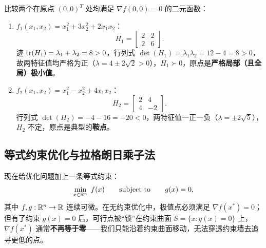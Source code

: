 \begin{example}[二维极小值与鞍点的手算辨析]\label{ex:ch5-min-vs-saddle}
比较两个在原点 $(0,0)^T$ 处均满足 $\nabla f(0,0) = 0$ 的二元函数：
\begin{enumerate}
  \item $f_1(x_1, x_2) = x_1^2 + 3x_2^2 + 2x_1 x_2$：
  \[
    H_1 = \begin{bmatrix} 2 & 2 \\ 2 & 6 \end{bmatrix}.
  \]
  迹 $\operatorname{tr}(H_1) = \lambda_1 + \lambda_2 = 8 > 0$，行列式 $\det(H_1) = \lambda_1\lambda_2 = 12 - 4 = 8 > 0$，故两特征值均严格为正（$\lambda = 4 \pm 2\sqrt{2} > 0$），$H_1 \succ 0$，原点是\textbf{严格局部（且全局）极小值}。
  \item $f_2(x_1, x_2) = x_1^2 - x_2^2 + 4x_1 x_2$：
  \[
    H_2 = \begin{bmatrix} 2 & 4 \\ 4 & -2 \end{bmatrix}.
  \]
  行列式 $\det(H_2) = -4 - 16 = -20 < 0$，两特征值一正一负（$\lambda = \pm 2\sqrt{5}$），$H_2$ 不定，原点是典型的\textbf{鞍点}。
\end{enumerate}
\end{example}

\subsection{等式约束优化与拉格朗日乘子法}

现在给优化问题加上一条等式约束：
\begin{equation}\label{eq:ch5-eq-opt}
  \min_{x\in\mathbb{R}^n}\; f(x) \qquad \text{subject to}\qquad g(x) = 0,
\end{equation}
其中 $f,g:\mathbb{R}^n\to\mathbb{R}$ 连续可微。在无约束优化中，极值点必须满足 $\nabla f(x^*) = 0$；但有了约束 $g(x)=0$ 后，可行点被“锁”在约束曲面 $S = \{x : g(x) = 0\}$ 上，$\nabla f(x^*)$ 通常\textbf{不再等于零}——我们只能沿着约束曲面移动，无法穿透约束墙去追寻更低的点。

